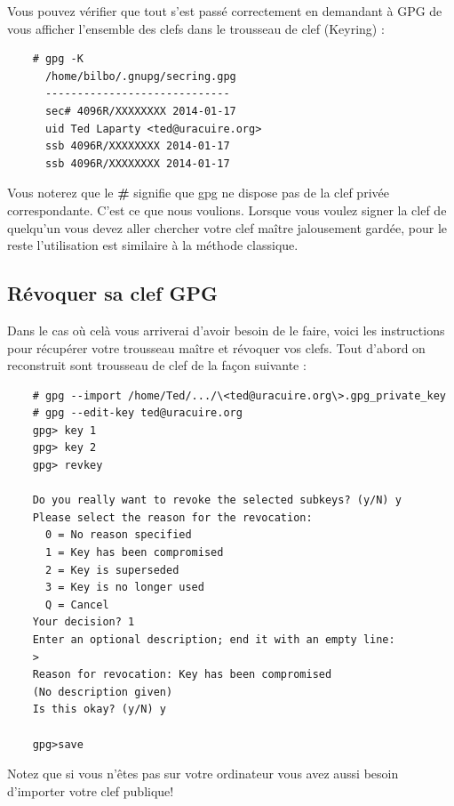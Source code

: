 \documentclass[a4paper]{article}
\begin{document}
Vous pouvez vérifier que tout s'est passé correctement en demandant à \textsc{GPG}
de vous afficher l'ensemble des clefs dans le trousseau de clef (Keyring) :
\begin{verbatim}
    # gpg -K
      /home/bilbo/.gnupg/secring.gpg
      -----------------------------
      sec# 4096R/XXXXXXXX 2014-01-17
      uid Ted Laparty <ted@uracuire.org>
      ssb 4096R/XXXXXXXX 2014-01-17
      ssb 4096R/XXXXXXXX 2014-01-17
\end{verbatim}
Vous noterez que le \textbf{\#} signifie que gpg ne dispose pas de la clef privée correspondante.
C'est ce que nous voulions. Lorsque vous voulez signer la clef de quelqu'un
vous devez aller chercher votre clef maître jalousement gardée, pour le reste
l'utilisation est similaire à la méthode classique.
\newpage
\subsection{Révoquer sa clef GPG}

Dans le cas où celà vous arriverai d'avoir besoin de le faire, voici les
instructions pour récupérer votre trousseau maître et révoquer vos clefs.
Tout d'abord on reconstruit sont trousseau de clef de la façon suivante :
\begin{verbatim}
    # gpg --import /home/Ted/.../\<ted@uracuire.org\>.gpg_private_key
    # gpg --edit-key ted@uracuire.org
    gpg> key 1
    gpg> key 2
    gpg> revkey

    Do you really want to revoke the selected subkeys? (y/N) y
    Please select the reason for the revocation:
      0 = No reason specified
      1 = Key has been compromised
      2 = Key is superseded
      3 = Key is no longer used
      Q = Cancel
    Your decision? 1
    Enter an optional description; end it with an empty line:
    >
    Reason for revocation: Key has been compromised
    (No description given)
    Is this okay? (y/N) y

    gpg>save
\end{verbatim}

Notez que si vous n'êtes pas sur votre ordinateur vous avez aussi besoin d'importer
votre clef publique!
\end{document}
